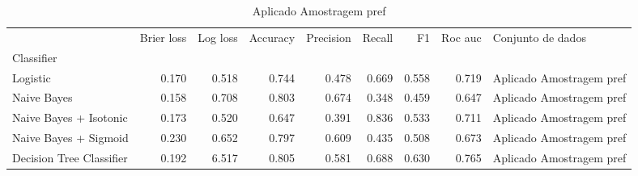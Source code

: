 \begin{table}
\centering
\caption{Aplicado Amostragem pref}
\label{Aplicado Amostragem pref 2}
\begin{tabular}{lrrrrrrrl}
\toprule
{} &  Brier  loss &  Log loss &  Accuracy  &  Precision  &  Recall  &    F1  &  Roc auc  &         Conjunto de dados \\
Classifier               &              &           &            &             &          &        &           &                           \\
\midrule
Logistic                 &        0.170 &     0.518 &      0.744 &       0.478 &    0.669 &  0.558 &     0.719 &  Aplicado Amostragem pref \\
Naive Bayes              &        0.158 &     0.708 &      0.803 &       0.674 &    0.348 &  0.459 &     0.647 &  Aplicado Amostragem pref \\
Naive Bayes + Isotonic   &        0.173 &     0.520 &      0.647 &       0.391 &    0.836 &  0.533 &     0.711 &  Aplicado Amostragem pref \\
Naive Bayes + Sigmoid    &        0.230 &     0.652 &      0.797 &       0.609 &    0.435 &  0.508 &     0.673 &  Aplicado Amostragem pref \\
Decision Tree Classifier &        0.192 &     6.517 &      0.805 &       0.581 &    0.688 &  0.630 &     0.765 &  Aplicado Amostragem pref \\
\bottomrule
\end{tabular}
\end{table}
